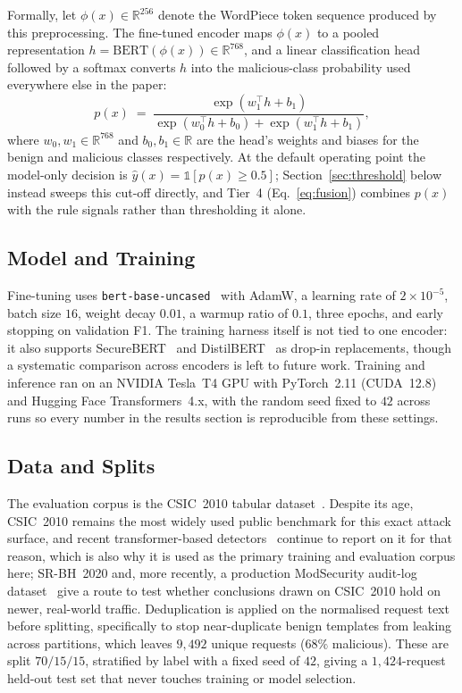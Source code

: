 \documentclass[conference]{IEEEtran}
\begin{document}
Formally, let $\phi(x)\in\mathbb{R}^{256}$ denote the WordPiece token
sequence produced by this preprocessing. The fine-tuned encoder maps
$\phi(x)$ to a pooled representation $h=\mathrm{BERT}(\phi(x))\in\mathbb{R}^{768}$,
and a linear classification head followed by a softmax converts $h$ into
the malicious-class probability used everywhere else in the paper:
\begin{equation}
p(x) \;=\; \frac{\exp(w_1^\top h + b_1)}{\exp(w_0^\top h + b_0) + \exp(w_1^\top h + b_1)},
\label{eq:softmax}
\end{equation}
where $w_0,w_1\in\mathbb{R}^{768}$ and $b_0,b_1\in\mathbb{R}$ are the
head's weights and biases for the benign and malicious classes
respectively. At the default operating point the model-only decision is
$\hat y(x) = \mathbb{1}[p(x)\ge 0.5]$; Section~\ref{sec:threshold}
below instead sweeps this cut-off directly, and Tier~4 (Eq.~\ref{eq:fusion})
combines $p(x)$ with the rule signals rather than thresholding it alone.

\subsection{Model and Training}
Fine-tuning uses \texttt{bert-base-uncased}~\cite{devlin2019bert} with
AdamW, a learning rate of $2{\times}10^{-5}$, batch size $16$, weight
decay $0.01$, a warmup ratio of $0.1$, three epochs, and early stopping
on validation F1. The training harness itself is not tied to one
encoder: it also supports SecureBERT~\cite{aghaei2022securebert,aghaei2025securebert2}
and DistilBERT~\cite{sanh2019distilbert} as drop-in replacements, though
a systematic comparison across encoders is left to future work. Training
and inference ran on an NVIDIA Tesla~T4 GPU with PyTorch~2.11 (CUDA~12.8)
and Hugging Face Transformers~4.x, with the random seed fixed to $42$
across runs so every number in the results section is reproducible from
these settings.

\subsection{Data and Splits}
The evaluation corpus is the CSIC~2010 tabular dataset~\cite{gimenez2010csic}.
Despite its age, CSIC~2010 remains the most widely used public benchmark
for this exact attack surface, and recent transformer-based
detectors~\cite{wadbert2026,liu2024bertlstm,scireports2024novelxsssqli}
continue to report on it for that reason, which is also why it is used as
the primary training and evaluation corpus here; SR-BH~2020 and, more
recently, a production ModSecurity audit-log
dataset~\cite{modsec30day2025} give a route to test whether conclusions
drawn on CSIC~2010 hold on newer, real-world traffic. Deduplication is applied on
the normalised request text before splitting,
specifically to stop near-duplicate benign templates from leaking across
partitions, which leaves $9{,}492$ unique requests ($68\%$ malicious). These are
split $70/15/15$, stratified by label with a fixed seed of $42$,
giving a $1{,}424$-request held-out test set that never touches training
or model selection.
\end{document}
